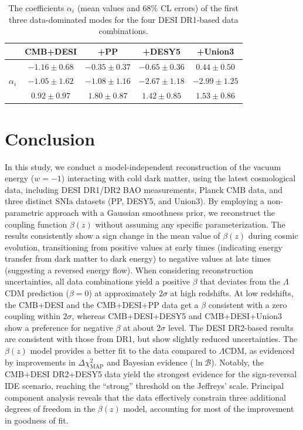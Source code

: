 \documentclass[a4paper,11pt]{article}
\begin{document}
  \begin{table}[!htbp]

    \renewcommand\arraystretch{1.5}
    \centering
    \caption{The coefficients $\alpha_i$ (mean values and 68\% CL errors) of the first three data-dominated modes for the four DESI DR1-based data combinations.}
    \label{tab2}
    \begin{tabular} { c|  c| c| c |c }
      \hline
                 &  CMB+DESI &  +PP  &  +DESY5 &  +Union3\\
     \hline
     
                &$-1.16 \pm 0.68$ & $-0.35 \pm 0.37$ & $-0.65 \pm 0.36$ & $0.44 \pm 0.50$ \\
     $\alpha_i$ &$-1.05 \pm 1.62$ & $-1.08 \pm 1.16$ & $-2.67 \pm 1.18$ & $-2.99 \pm 1.25$ \\
                &$0.92 \pm 0.97$ & $1.80 \pm 0.87$ & $1.42 \pm 0.85$ & $1.53 \pm 0.86$ \\
          
     \hline
     \end{tabular}
    \end{table}



\section{Conclusion}\label{sec:conclusions}

In this study, we conduct a model-independent reconstruction of the vacuum energy ($w=-1$) interacting with cold dark matter, using the latest cosmological data, including DESI DR1/DR2 BAO measurements, Planck CMB data, and three distinct SNIa datasets (PP, DESY5, and Union3). By employing a non-parametric approach with a Gaussian smoothness prior, we reconstruct the coupling function $\beta(z)$ without assuming any specific parameterization. The results consistently show a sign change in the mean value of $\beta(z)$ during cosmic evolution, transitioning from positive values at early times (indicating energy transfer from dark matter to dark energy) to negative values at late times (suggesting a reversed energy flow). When considering reconstruction uncertainties, all data combinations yield a positive $\beta$ that deviates from the $\Lambda$CDM prediction ($\beta=0$) at approximately $2\sigma$ at high redshifts. At low redshifts, the CMB+DESI and the CMB+DESI+PP data get a $\beta$ consistent with a zero coupling within $2\sigma$, whereas CMB+DESI+DESY5 and CMB+DESI+Union3 show a preference for negative $\beta$ at about $2\sigma$ level. The DESI DR2-based results are consistent with those from DR1, but show slightly reduced uncertainties. The $\beta(z)$ model provides a better fit to the data compared to $\Lambda$CDM, as evidenced by improvements in $\Delta\chi^2_{\mathrm{MAP}}$ and Bayesian evidence ($\ln \mathcal{B}$). Notably, the CMB+DESI DR2+DESY5 data yield the strongest evidence for the sign-reversal IDE scenario, reaching the ``strong'' threshold on the Jeffreys' scale. Principal component analysis reveals that the data effectively constrain three additional degrees of freedom in the $\beta(z)$ model, accounting for most of the improvement in goodness of fit. 
\end{document}
